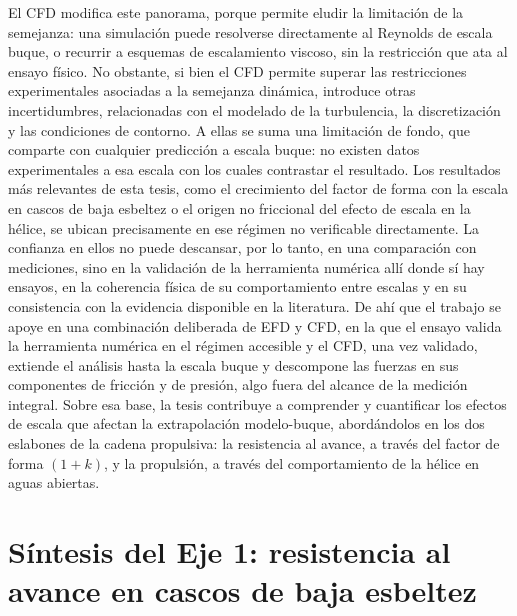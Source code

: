 El CFD modifica este panorama, porque permite eludir la limitación de la
semejanza: una simulación puede resolverse directamente al Reynolds de escala
buque, o recurrir a esquemas de escalamiento viscoso, sin la restricción que ata
al ensayo físico. No obstante, si bien el CFD permite superar las restricciones
experimentales asociadas a la semejanza dinámica, introduce otras incertidumbres,
relacionadas con el modelado de la turbulencia, la discretización y las
condiciones de contorno. A ellas se suma una limitación de fondo, que comparte con
cualquier predicción a escala buque: no existen datos experimentales a esa escala
con los cuales contrastar el resultado. Los resultados más relevantes de esta
tesis, como el crecimiento del factor de forma con la escala en cascos de baja
esbeltez o el origen no friccional del efecto de escala en la hélice, se ubican
precisamente en ese régimen no verificable directamente. La confianza en ellos no
puede descansar, por lo tanto, en una comparación con mediciones, sino en la
validación de la herramienta numérica allí donde sí hay ensayos, en la coherencia
física de su comportamiento entre escalas y en su consistencia con la evidencia
disponible en la literatura. De ahí que el trabajo se apoye en una combinación
deliberada de EFD y CFD, en la que el ensayo valida la herramienta numérica en el
régimen accesible y el CFD, una vez validado, extiende el análisis hasta la escala
buque y descompone las fuerzas en sus componentes de fricción y de presión, algo
fuera del alcance de la medición integral. Sobre esa base, la tesis contribuye a
comprender y cuantificar los efectos de escala que afectan la extrapolación
modelo-buque, abordándolos en los dos eslabones de la cadena propulsiva: la
resistencia al avance, a través del factor de forma $(1+k)$, y la propulsión, a
través del comportamiento de la hélice en aguas abiertas.

\section{Síntesis del Eje 1: resistencia al avance en cascos de baja esbeltez}

